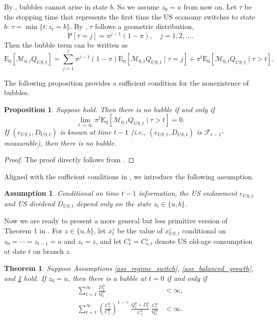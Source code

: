 \documentclass[12pt]{article}
\theoremstyle{plain}
\newtheorem{thm}{Theorem}
\newtheorem{ass}{Assumption}
\newtheorem{prop}{Proposition}
\begin{document}
By , bubbles cannot arise in state $b$. So we assume $z_0=u$ from now on. Let $\tau$ be the stopping time that represents the first time the US economy switches to state $b$:
$\tau =\min \{t:z_t=b\}$. By , $\tau$ follows a geometric distribution,
\[
\mathrm{P}[\tau=j]=\pi^{j-1}(1-\pi), \quad j=1,2,\dots.
\]
Then the bubble term can be written as
\[
\mathrm{E}_0\left[\mathcal{M}_{0 , t} Q_{US,t}\right]
=\sum_{j=1}^t \pi^{j-1}(1-\pi) \mathrm{E}_0\left[\mathcal{M}_{0,t} Q_{US,t} \mid \tau=j\right]
+\pi^t \mathrm{E}_0\left[\mathcal{M}_{0, t} Q_{US,t} \mid \tau>t\right].
\]

The following proposition provides a sufficient condition for the nonexistence of bubbles.

\begin{prop}\label{prop2}
Suppose  hold. Then there is no bubble if and only if
\[
\lim _{t \rightarrow \infty} \pi^t \mathrm{E}_0\left[\mathcal{M}_{0,t} Q_{US,t} \mid \tau>t\right]=0.
\]
If $(e_{US,t}, D_{US,t})$ is known at time $t-1$ (i.e., $(e_{US,t},D_{US,t})$ is $\mathcal{F}_{t-1}$-measurable), then there is no bubble.
\end{prop}

\begin{proof}
The proof directly follows from \citet{hirano2025technological}.
\end{proof}

Aligned with the sufficient conditions in , we introduce the following assumption.

\begin{ass}\label{ass_switch_dependence}
Conditional on time $t-1$ information, the US endowment $e_{US,t}$ and US dividend $D_{US,t}$ depend only on the state
$z_t \in \{u,b\}$.
\end{ass}


Now we are ready to present a more general but less primitive version of Theorem 1 in \citet{hirano2025technological}.
For $z\in\{u,b\}$, let $x_t^z$ be the value of $x_{US,t}^z$ conditional on $z_0=\cdots=z_{t-1}=u$ and $z_t=z$,
and let $C_t^z=C_{o,t}^z$ denote US old-age consumption at date $t$ on branch $z$.

\begin{thm}\label{thm_1}
Suppose Assumptions \ref{ass_regime_switch}, \ref{ass_balanced_growth}, and \ref{ass_switch_dependence} hold. If $z_0=u$, then there is a bubble at $t=0$ if and only if
\begin{subequations}\label{thm_cond1}
\begin{align}
\sum_{t=1}^\infty \frac{D_t^u}{Q_t^u}&<\infty, \label{thm_cond_1a}\\
\sum_{t=1}^\infty
\left(\frac{C_t^b}{C_t^u}\right)^{1-\gamma}\;
\frac{Q_t^b+D_t^b}{C_t^b}\;
\frac{C_t^u}{Q_t^u}&<\infty. \label{thm_cond_1b}
\end{align}
\end{subequations}
\end{thm}
\end{document}
